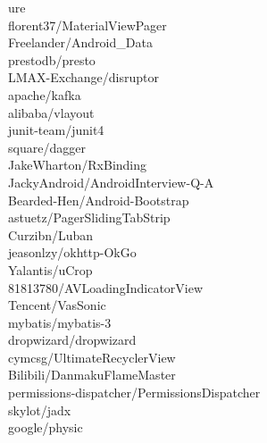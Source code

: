 \documentclass[twoside]{praca}
\begin{document}
\begin{multicols}{3}
ure\\florent37/MaterialViewPager\\Freelander/Android\_Data\\prestodb/presto\\LMAX-Exchange/disruptor\\apache/kafka\\alibaba/vlayout\\junit-team/junit4\\square/dagger\\JakeWharton/RxBinding\\JackyAndroid/Android\-In\-ter\-view-Q-A\\Bearded-Hen/Android-Bootstrap\\astuetz/PagerSlidingTabStrip\\Curzibn/Luban\\jeasonlzy/okhttp-OkGo\\Yalantis/uCrop\\81813780/AVLoadingIndicator\-View\\Tencent/VasSonic\\mybatis/mybatis-3\\dropwizard/dropwizard\\cymcsg/UltimateRecyclerView\\Bilibili/DanmakuFlameMaster\\permissions-dispatcher/\-Permissions\-Dispatcher\\skylot/jadx\\google/physic
\end{multicols}
\end{document}
